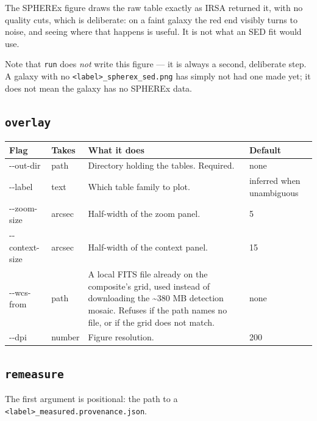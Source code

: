 \documentclass[11pt]{article}
\begin{document}
The SPHEREx figure draws the raw table exactly as IRSA returned it, with no
quality cuts, which is deliberate: on a faint galaxy the red end visibly
turns to noise, and seeing where that happens is useful. It is not what an
SED fit would use.

Note that \texttt{run} does \emph{not} write this figure --- it is always a
second, deliberate step. A galaxy with no
\texttt{<label>\_spherex\_sed.png} has simply not had one made yet; it does
not mean the galaxy has no SPHEREx data.

\subsection{\texttt{overlay}}

\begin{longtable}{T{2.9cm} L{2.15cm} L{6.45cm} L{2.7cm}}
\toprule
\textbf{\normalfont Flag} & \textbf{Takes} & \textbf{What it does} & \textbf{Default} \\
\midrule
\endhead
-{}-out-dir & path & Directory holding the tables. Required. & none \\[2pt]
-{}-label & text & Which table family to plot. & inferred when
  unambiguous \\[2pt]
-{}-zoom-size & arcsec & Half-width of the zoom panel. & 5 \\[2pt]
-{}-context-size & arcsec & Half-width of the context panel. & 15 \\[2pt]
-{}-wcs-from & path & A local FITS file already on the composite's grid,
  used instead of downloading the \textasciitilde380 MB detection mosaic.
  Refuses if the path names no file, or if the grid does not match. &
  none \\[2pt]
-{}-dpi & number & Figure resolution. & 200 \\
\bottomrule
\end{longtable}

\subsection{\texttt{remeasure}}

The first argument is positional: the path to a
\texttt{<label>\_measured.provenance.json}.
\end{document}
